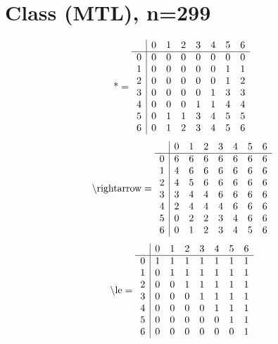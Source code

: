 \documentclass[11pt]{article}
\begin{document}
\section{Class (MTL), n=299}
\[\text{*} = 
\begin{array}{r | r r r r r r r}
 & 0 & 1 & 2 & 3 & 4 & 5 & 6 \\ \hline
0 & 0 & 0 & 0 & 0 & 0 & 0 & 0 \\
1 & 0 & 0 & 0 & 0 & 0 & 1 & 1 \\
2 & 0 & 0 & 0 & 0 & 0 & 1 & 2 \\
3 & 0 & 0 & 0 & 0 & 1 & 3 & 3 \\
4 & 0 & 0 & 0 & 1 & 1 & 4 & 4 \\
5 & 0 & 1 & 1 & 3 & 4 & 5 & 5 \\
6 & 0 & 1 & 2 & 3 & 4 & 5 & 6 \\
\end{array}
\]
\[\text{\textbackslash rightarrow} = 
\begin{array}{r | r r r r r r r}
 & 0 & 1 & 2 & 3 & 4 & 5 & 6 \\ \hline
0 & 6 & 6 & 6 & 6 & 6 & 6 & 6 \\
1 & 4 & 6 & 6 & 6 & 6 & 6 & 6 \\
2 & 4 & 5 & 6 & 6 & 6 & 6 & 6 \\
3 & 3 & 4 & 4 & 6 & 6 & 6 & 6 \\
4 & 2 & 4 & 4 & 4 & 6 & 6 & 6 \\
5 & 0 & 2 & 2 & 3 & 4 & 6 & 6 \\
6 & 0 & 1 & 2 & 3 & 4 & 5 & 6 \\
\end{array}
\]
\[\text{\textbackslash le} = 
\begin{array}{r | r r r r r r r}
 & 0 & 1 & 2 & 3 & 4 & 5 & 6 \\ \hline
0 & 1 & 1 & 1 & 1 & 1 & 1 & 1 \\
1 & 0 & 1 & 1 & 1 & 1 & 1 & 1 \\
2 & 0 & 0 & 1 & 1 & 1 & 1 & 1 \\
3 & 0 & 0 & 0 & 1 & 1 & 1 & 1 \\
4 & 0 & 0 & 0 & 0 & 1 & 1 & 1 \\
5 & 0 & 0 & 0 & 0 & 0 & 1 & 1 \\
6 & 0 & 0 & 0 & 0 & 0 & 0 & 1 \\
\end{array}
\]
\end{document}
